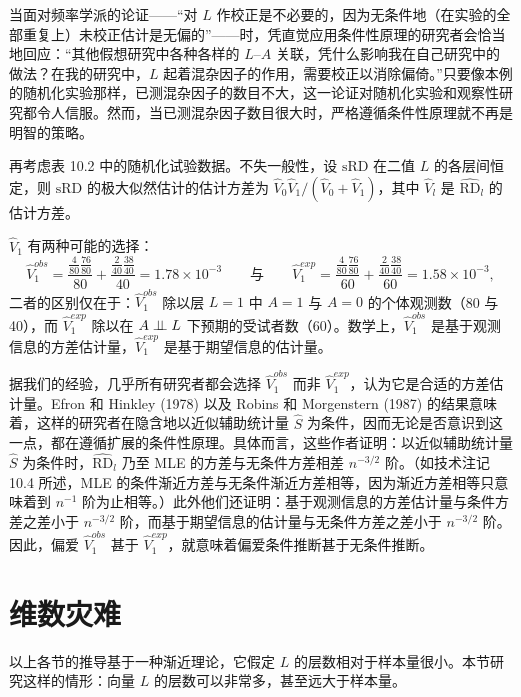 当面对频率学派的论证——“对 $L$ 作校正是不必要的，因为无条件地（在实验的全部重复上）未校正估计是无偏的”——时，凭直觉应用条件性原理的研究者会恰当地回应：“其他假想研究中各种各样的 $L$–$A$ 关联，凭什么影响我在自己研究中的做法？在我的研究中，$L$ 起着混杂因子的作用，需要校正以消除偏倚。”只要像本例的随机化实验那样，已测混杂因子的数目不大，这一论证对随机化实验和观察性研究都令人信服。然而，当已测混杂因子数目很大时，严格遵循条件性原理就不再是明智的策略。

\begin{techpoint}[多数研究者凭直觉遵循扩展的条件性原理]
再考虑表 10.2 中的随机化试验数据。不失一般性，设 $\mathrm{sRD}$ 在二值 $L$ 的各层间恒定，则 $\mathrm{sRD}$ 的极大似然估计的估计方差为 $\hat V_0\hat V_1/(\hat V_0+\hat V_1)$，其中 $\hat V_l$ 是 $\widehat{\mathrm{RD}}_l$ 的估计方差。

$\hat V_1$ 有两种可能的选择：
\[
\hat V_1^{obs}=\frac{\frac{4}{80}\frac{76}{80}}{80}+\frac{\frac{2}{40}\frac{38}{40}}{40}=1.78\times 10^{-3}
\qquad\text{与}\qquad
\hat V_1^{exp}=\frac{\frac{4}{80}\frac{76}{80}}{60}+\frac{\frac{2}{40}\frac{38}{40}}{60}=1.58\times 10^{-3},
\]
二者的区别仅在于：$\hat V_1^{obs}$ 除以层 $L=1$ 中 $A=1$ 与 $A=0$ 的个体观测数（80 与 40），而 $\hat V_1^{exp}$ 除以在 $A\perp\!\!\!\perp L$ 下预期的受试者数（60）。数学上，$\hat V_1^{obs}$ 是基于观测信息的方差估计量，$\hat V_1^{exp}$ 是基于期望信息的估计量。

据我们的经验，几乎所有研究者都会选择 $\hat V_1^{obs}$ 而非 $\hat V_1^{exp}$，认为它是合适的方差估计量。Efron 和 Hinkley (1978) 以及 Robins 和 Morgenstern (1987) 的结果意味着，这样的研究者在隐含地以近似辅助统计量 $\hat S$ 为条件，因而无论是否意识到这一点，都在遵循扩展的条件性原理。具体而言，这些作者证明：以近似辅助统计量 $\hat S$ 为条件时，$\widehat{\mathrm{RD}}_l$ 乃至 MLE 的方差与无条件方差相差 $n^{-3/2}$ 阶。（如技术注记 10.4 所述，MLE 的条件渐近方差与无条件渐近方差相等，因为渐近方差相等只意味着到 $n^{-1}$ 阶为止相等。）此外他们还证明：基于观测信息的方差估计量与条件方差之差小于 $n^{-3/2}$ 阶，而基于期望信息的估计量与无条件方差之差小于 $n^{-3/2}$ 阶。因此，偏爱 $\hat V_1^{obs}$ 甚于 $\hat V_1^{exp}$，就意味着偏爱条件推断甚于无条件推断。
\end{techpoint}

\section{维数灾难}

以上各节的推导基于一种渐近理论，它假定 $L$ 的层数相对于样本量很小。本节研究这样的情形：向量 $L$ 的层数可以非常多，甚至远大于样本量。

